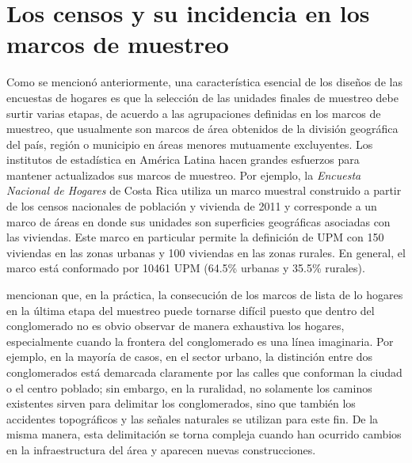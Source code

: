 \documentclass[
  12pt,
  spanish,
]{book}
\begin{document}
\hypertarget{los-censos-y-su-incidencia-en-los-marcos-de-muestreo}{%
\section{Los censos y su incidencia en los marcos de muestreo}\label{los-censos-y-su-incidencia-en-los-marcos-de-muestreo}}

Como se mencionó anteriormente, una característica esencial de los diseños de las encuestas de hogares es que la selección de las unidades finales de muestreo debe surtir varias etapas, de acuerdo a las agrupaciones definidas en los marcos de muestreo, que usualmente son marcos de área obtenidos de la división geográfica del país, región o municipio en áreas menores mutuamente excluyentes. Los institutos de estadística en América Latina hacen grandes esfuerzos para mantener actualizados sus marcos de muestreo. Por ejemplo, la \emph{Encuesta Nacional de Hogares} de Costa Rica utiliza un marco muestral construido a partir de los censos nacionales de población y vivienda de 2011 y corresponde a un marco de áreas en donde sus unidades son superficies geográficas asociadas con las viviendas. Este marco en particular permite la definición de UPM con 150 viviendas en las zonas urbanas y 100 viviendas en las zonas rurales. En general, el marco está conformado por 10461 UPM (64.5\% urbanas y 35.5\% rurales).

\citet{Gambino_Silva_2009} mencionan que, en la práctica, la consecución de los marcos de lista de lo hogares en la última etapa del muestreo puede tornarse difícil puesto que dentro del conglomerado no es obvio observar de manera exhaustiva los hogares, especialmente cuando la frontera del conglomerado es una línea imaginaria. Por ejemplo, en la mayoría de casos, en el sector urbano, la distinción entre dos conglomerados está demarcada claramente por las calles que conforman la ciudad o el centro poblado; sin embargo, en la ruralidad, no solamente los caminos existentes sirven para delimitar los conglomerados, sino que también los accidentes topográficos y las señales naturales se utilizan para este fin. De la misma manera, esta delimitación se torna compleja cuando han ocurrido cambios en la infraestructura del área y aparecen nuevas construcciones.
\end{document}
